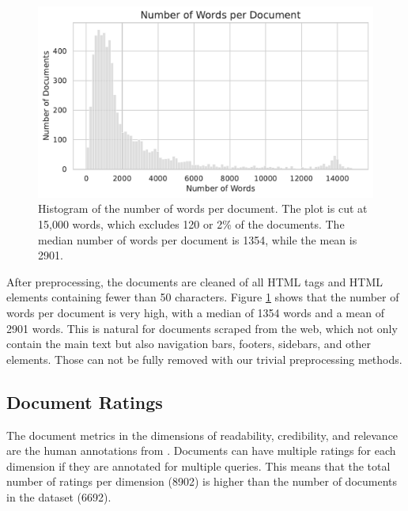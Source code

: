 \begin{figure}[tb]
\centering
\includegraphics[width=\textwidth]{images/num_words_per_passage.pdf}
\caption{Histogram of the number of words per document. The plot is cut at 15,000 words, which excludes 120 or 2\% of the documents. The median number of words per document is 1354, while the mean is 2901.}
\label{fig:num_words_per_document}
\end{figure}
After preprocessing, the documents are cleaned of all HTML tags and HTML elements containing fewer than 50 characters.
Figure \ref{fig:num_words_per_document} shows that the number of words per document is very high, with a median of 1354 words and a mean of 2901 words.
This is natural for documents scraped from the web, which not only contain the main text but also navigation bars, footers, sidebars, and other elements.
Those can not be fully removed with our trivial preprocessing methods.
\subsection{Document Ratings}
The document metrics in the dimensions of readability, credibility, and relevance are the human annotations from \cite{goeuriot:2021:Consumer}.
Documents can have multiple ratings for each dimension if they are annotated for multiple queries.
This means that the total number of ratings per dimension (8902) is higher than the number of documents in the dataset (6692).


